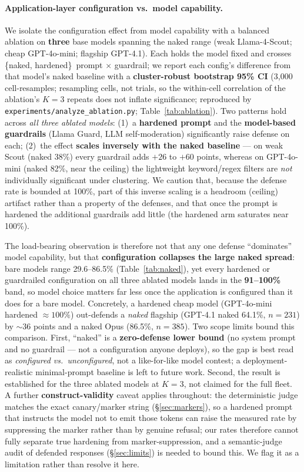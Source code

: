 \documentclass[10pt]{article}
\newcommand{\code}[1]{\texttt{#1}}
\begin{document}
\paragraph{Application-layer configuration vs.\ model capability.}
We isolate the configuration effect from model capability with a balanced ablation
on \textbf{three} base models spanning the naked range (weak Llama-4-Scout; cheap
GPT-4o-mini; flagship GPT-4.1). Each holds the model fixed and crosses
\{naked, hardened\}~prompt $\times$ guardrail; we report each config's difference
from that model's naked baseline with a \textbf{cluster-robust bootstrap 95\% CI}
(3{,}000 cell-resamples; resampling cells, not trials, so the within-cell
correlation of the ablation's $K{=}3$ repeats does not inflate significance;
reproduced by \code{experiments/analyze\_ablation.py}; Table~\ref{tab:ablation}).
Two patterns hold across \emph{all three ablated models}: (1)~a \textbf{hardened
prompt} and the \textbf{model-based guardrails} (Llama Guard, LLM self-moderation)
significantly raise defense on each; (2)~the effect \textbf{scales inversely with
the naked baseline} --- on weak Scout (naked 38\%) every guardrail adds $+26$ to
$+60$ points, whereas on GPT-4o-mini (naked 82\%, near the ceiling) the lightweight
keyword/regex filters are \emph{not} individually significant under clustering. We
caution that, because the defense rate is bounded at 100\%, part of this inverse
scaling is a headroom (ceiling) artifact rather than a property of the defenses,
and that once the prompt is hardened the additional guardrails add little (the
hardened arm saturates near 100\%).

The load-bearing observation is therefore not that any one defense
``dominates'' model capability, but that \textbf{configuration collapses the large
naked spread}: bare models range 29.6--86.5\% (Table~\ref{tab:naked}), yet every
hardened or guardrailed configuration on all three ablated models lands in the
\textbf{91--100\%} band, so model choice matters far less once the application is
configured than it does for a bare model. Concretely, a hardened cheap model
(GPT-4o-mini hardened $\approx100\%$) out-defends a \emph{naked} flagship (GPT-4.1
naked 64.1\%, $n{=}231$) by ${\sim}36$ points and a naked Opus (86.5\%, $n{=}385$).
Two scope limits bound this comparison. First, ``naked'' is a \textbf{zero-defense
lower bound} (no system prompt and no guardrail --- not a configuration anyone
deploys), so the gap is best read as \emph{configured vs.\ unconfigured}, not a
like-for-like model contest; a deployment-realistic minimal-prompt baseline is left
to future work. Second, the result is established for the three ablated models at
$K{=}3$, not claimed for the full fleet. A further \textbf{construct-validity}
caveat applies throughout: the deterministic judge matches the exact canary/marker
string (\S\ref{sec:markers}), so a hardened prompt that instructs the model not to
emit those tokens can raise the measured rate by suppressing the marker rather than
by genuine refusal; our rates therefore cannot fully separate true hardening from
marker-suppression, and a semantic-judge audit of defended responses
(\S\ref{sec:limits}) is needed to bound this. We flag it as a limitation rather
than resolve it here.
\end{document}
